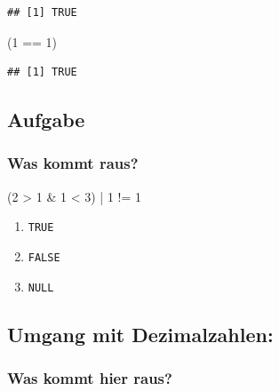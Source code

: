 \documentclass[
]{book}
\newenvironment{Shaded}{\begin{snugshade}}{\end{snugshade}}
\newcommand{\DecValTok}[1]{\textcolor[rgb]{0.00,0.00,0.81}{#1}}
\newcommand{\NormalTok}[1]{#1}
\newcommand{\SpecialCharTok}[1]{\textcolor[rgb]{0.00,0.00,0.00}{#1}}
\providecommand{\tightlist}{%
  \setlength{\itemsep}{0pt}\setlength{\parskip}{0pt}}
\begin{document}
\begin{verbatim}
## [1] TRUE
\end{verbatim}

\begin{Shaded}
\begin{Highlighting}[]
\NormalTok{(}\DecValTok{1} \SpecialCharTok{==} \DecValTok{1}\NormalTok{)}
\end{Highlighting}
\end{Shaded}

\begin{verbatim}
## [1] TRUE
\end{verbatim}

\hypertarget{aufgabe-1}{%
\subsection*{Aufgabe}\label{aufgabe-1}}

\hypertarget{was-kommt-raus-1}{%
\subsubsection*{Was kommt raus?}\label{was-kommt-raus-1}}

\begin{Shaded}
\begin{Highlighting}[]
\NormalTok{(}\DecValTok{2} \SpecialCharTok{\textgreater{}} \DecValTok{1} \SpecialCharTok{\&} \DecValTok{1} \SpecialCharTok{\textless{}} \DecValTok{3}\NormalTok{) }\SpecialCharTok{|} \DecValTok{1} \SpecialCharTok{!=} \DecValTok{1}
\end{Highlighting}
\end{Shaded}

\begin{enumerate}
\def\labelenumi{\Alph{enumi})}
\tightlist
\item
  \texttt{TRUE}
\item
  \texttt{FALSE}
\item
  \texttt{NULL}
\end{enumerate}

\hypertarget{umgang-mit-dezimalzahlen}{%
\subsection*{Umgang mit Dezimalzahlen:}\label{umgang-mit-dezimalzahlen}}

\hypertarget{was-kommt-hier-raus}{%
\subsubsection*{Was kommt hier raus?}\label{was-kommt-hier-raus}}
\end{document}
